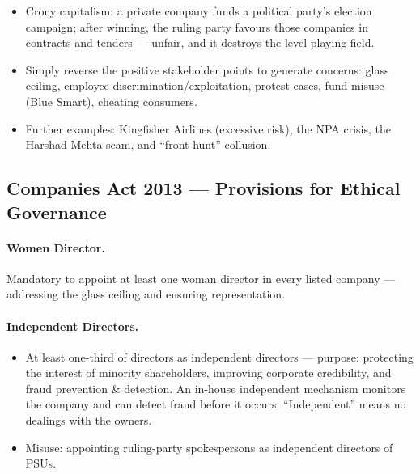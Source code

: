 \begin{ExampleBox}
\begin{itemize}
\item Crony capitalism: a private company funds a political party's election campaign; after winning, the ruling party favours those companies in contracts and tenders --- unfair, and it destroys the level playing field.
\item Simply reverse the positive stakeholder points to generate concerns: glass ceiling, employee discrimination/exploitation, protest cases, fund misuse (Blue Smart), cheating consumers.
\item Further examples: Kingfisher Airlines (excessive risk), the NPA crisis, the Harshad Mehta scam, and ``front-hunt'' collusion.
\end{itemize}
\end{ExampleBox}

\subsection{Companies Act 2013 --- Provisions for Ethical Governance}

\paragraph{Women Director.}
\begin{GovtPolicy}
Mandatory to appoint at least one woman director in every listed company --- addressing the glass ceiling and ensuring representation.
\end{GovtPolicy}

\paragraph{Independent Directors.}
\begin{GovtPolicy}
\begin{itemize}
\item At least one-third of directors as independent directors --- purpose: protecting the interest of minority shareholders, improving corporate credibility, and fraud prevention \& detection. An in-house independent mechanism monitors the company and can detect fraud before it occurs. ``Independent'' means no dealings with the owners.
\item Misuse: appointing ruling-party spokespersons as independent directors of PSUs.
\end{itemize}
\end{GovtPolicy}


